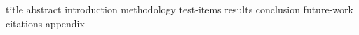 \documentclass {journal}
\begin{document}
\def \JoDPagesTotal {30000}
\def \JoDPagesGoldStandard {15000}

 {title}
 {abstract}
 {introduction}
 {methodology}
 {test-items}
 {results}
 {conclusion}
 {future-work}
 {citations}
 {appendix}
\end{document}
